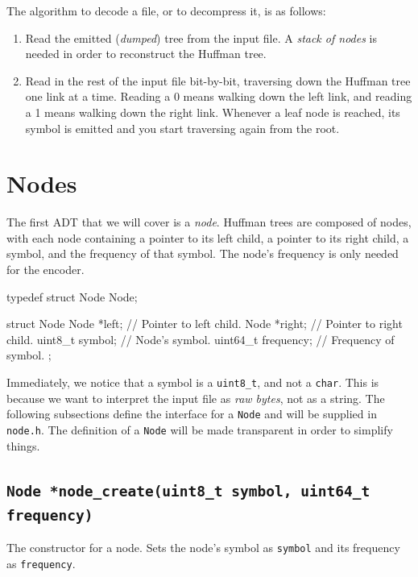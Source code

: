 \documentclass[11pt]{article}
\begin{document}
\noindent The algorithm to decode a file, or to decompress it, is as follows:

\begin{enumerate}
  \item Read the emitted (\emph{dumped}) tree from the input file. A
    \emph{stack of nodes} is needed in order to reconstruct the Huffman
    tree.

  \item Read in the rest of the input file bit-by-bit, traversing down
    the Huffman tree one link at a time. Reading a 0 means walking down
    the left link, and reading a 1 means walking down the right link.
    Whenever a leaf node is reached, its symbol is emitted and you start
    traversing again from the root.
\end{enumerate}

\section{Nodes}

The first ADT that we will cover is a \emph{node}. Huffman trees
are composed of nodes, with each node containing a pointer to its left
child, a pointer to its right child, a symbol, and the frequency of that
symbol. The node's frequency is only needed for the encoder.

\begin{codelisting}{}
typedef struct Node Node;

struct Node {
    Node *left;         // Pointer to left child.
    Node *right;        // Pointer to right child.
    uint8_t symbol;     // Node's symbol.
    uint64_t frequency; // Frequency of symbol.
};
\end{codelisting}

Immediately, we notice that a symbol is a \texttt{uint8\_t}, and not a
\texttt{char}. This is because we want to interpret the input file as
\emph{raw bytes}, not as a string. The following subsections define the
interface for a \texttt{Node} and will be supplied in \texttt{node.h}.
The definition of a \texttt{Node} will be made transparent in order to
simplify things.

\subsection{\texttt{Node *node\_create(uint8\_t symbol, uint64\_t frequency)}}

The constructor for a node. Sets the node's symbol as \texttt{symbol} and
its frequency as \texttt{frequency}.
\end{document}
